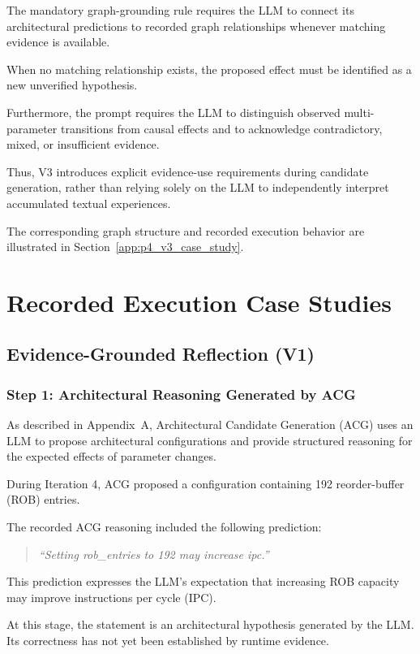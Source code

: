 The mandatory graph-grounding rule requires
the LLM to connect its architectural predictions
to recorded graph relationships whenever
matching evidence is available.

When no matching relationship exists,
the proposed effect must be identified
as a new unverified hypothesis.

Furthermore, the prompt requires the
LLM to distinguish observed multi-parameter
transitions from causal effects and to
acknowledge contradictory, mixed, or
insufficient evidence.

Thus, V3 introduces explicit evidence-use
requirements during candidate generation,
rather than relying solely on the LLM
to independently interpret accumulated
textual experiences.

The corresponding graph structure and
recorded execution behavior are illustrated
in Section~\ref{app:p4_v3_case_study}.


\section{Recorded Execution Case Studies}
\label{app:p4_case_studies}

\subsection{Evidence-Grounded Reflection (V1)}
\label{app:p4_v1_case_study}
\subsubsection{Step 1: Architectural Reasoning Generated by ACG}

As described in Appendix~A, Architectural Candidate
Generation (ACG) uses an LLM to propose architectural
configurations and provide structured reasoning
for the expected effects of parameter changes.

During Iteration 4, ACG proposed a configuration
containing 192 reorder-buffer (ROB) entries.

The recorded ACG reasoning included the following
prediction:

\begin{quote}
\emph{``Setting rob\_entries to 192 may increase ipc.''}
\end{quote}

This prediction expresses the LLM's expectation
that increasing ROB capacity may improve
instructions per cycle (IPC).

At this stage, the statement is an architectural
hypothesis generated by the LLM. Its correctness
has not yet been established by runtime evidence.

